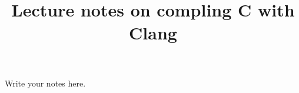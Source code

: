 \documentclass{article}
\title{Lecture notes on compling C with Clang}
\begin{document}
\maketitle

Write your notes here.
\end{document}
